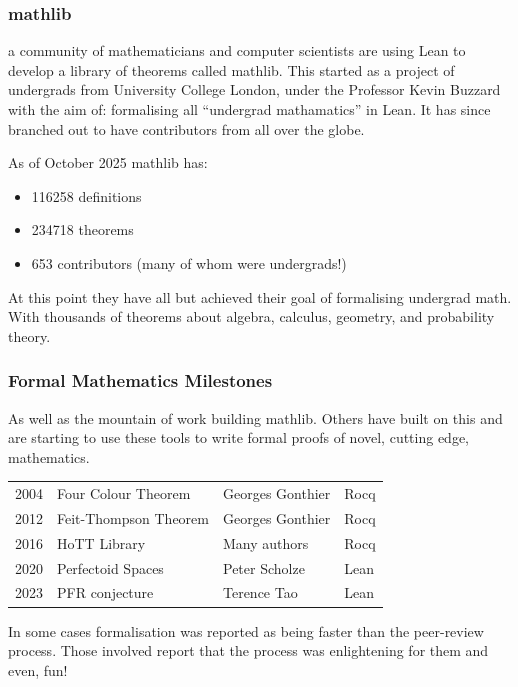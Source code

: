 \documentclass{beamer}
\theoremstyle{indentDefn} \newtheorem{defn}[]{Definition}
\begin{document}
\begin{frame}
	\frametitle{mathlib}
	
	a community of mathematicians and computer scientists are using Lean to develop a library of theorems called mathlib. This started as a project of undergrads from University College London, under the Professor Kevin Buzzard with the aim of: formalising all ``undergrad mathamatics'' in Lean. It has since branched out to have contributors from all over the globe.
	
	As of October 2025 mathlib has: 
	
	\begin{itemize}
		\item[] 116258 definitions 
		\item[] 234718 theorems 
		\item[] 653 contributors (many of whom were undergrads!)
	\end{itemize}
	
	At this point they have all but achieved their goal of formalising undergrad math. With thousands of theorems about algebra, calculus, geometry, and probability theory.
\end{frame}

\begin{frame}
	\frametitle{Formal Mathematics Milestones}
	
	As well as the mountain of work building mathlib. Others have built on this and are starting to use these tools to write formal proofs of novel, cutting edge, mathematics.
	
	\begin{tabular}{r | l l l}
		2004 & Four Colour Theorem & Georges Gonthier & Rocq \\
		2012 & Feit-Thompson Theorem & Georges Gonthier & Rocq \\
		2016 & HoTT Library & Many authors & Rocq \\
		2020 & Perfectoid Spaces & Peter Scholze & Lean \\ 
		2023 & PFR conjecture & Terence Tao & Lean
	\end{tabular}
	
	In some cases formalisation was reported as being faster than the peer-review process. Those involved report that the process was enlightening for them and even, fun! 
\end{frame}
\end{document}
